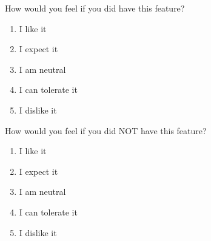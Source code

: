 \documentclass[../main.tex]{subfiles}
\begin{document}
\begin{enumerate}
    How would you feel if you did have this feature?
    \begin{enumerate}
        \item I like it
        \item I expect it
        \item  I am neutral
        \item I can tolerate it
        \item I dislike it
    \end{enumerate}

    How would you feel if you did NOT have this feature?
    \begin{enumerate}
        \item I like it
        \item I expect it
        \item  I am neutral
        \item I can tolerate it
        \item I dislike it
    \end{enumerate}
    
\end{enumerate}
\end{document}
